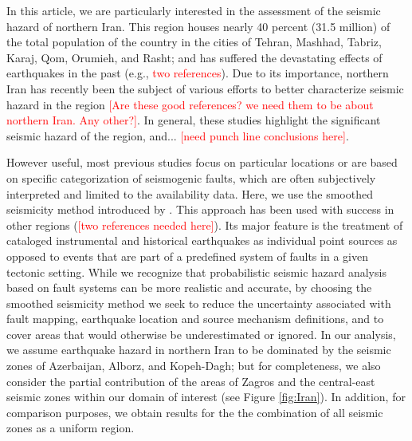 In this article, we are particularly interested in the assessment of the seismic hazard of northern Iran. This region houses nearly 40 percent (31.5 million) of the total population of the country in the cities of Tehran, Mashhad, Tabriz, Karaj, Qom, Orumieh, and Rasht; and has suffered the devastating effects of earthquakes in the past (e.g., \textcolor{red}{two references}). Due to its importance, northern Iran has recently been the subject of various efforts to better characterize seismic hazard in the region \citep[e.g.,][]{Ghodrati2011, Abdollahzadeh2014a, Boostan2015} \textcolor{red}{[Are these good references? we need them to be about northern Iran. Any other?]}. In general, these studies highlight the significant seismic hazard of the region, and... \textcolor{red}{[need punch line conclusions here]}. 

However useful, most previous studies focus on particular locations or are based on specific categorization of seismogenic faults, which are often subjectively interpreted and limited to the availability data. Here, we use the smoothed seismicity method introduced by \citet{Frankel1995}. This approach has been used with success in other regions (\textcolor{red}{[two references needed here]}). Its major feature is the treatment of cataloged instrumental and historical earthquakes as individual point sources as opposed to events that are part of a predefined system of faults in a given tectonic setting. While we recognize that probabilistic seismic hazard analysis based on fault systems can be more realistic and accurate, by choosing the smoothed seismicity method we seek to reduce the uncertainty associated with fault mapping, earthquake location and source mechanism definitions, and to cover areas that would otherwise be underestimated or ignored. In our analysis, we assume earthquake hazard in northern Iran to be dominated by the seismic zones of Azerbaijan, Alborz, and Kopeh-Dagh; but for completeness, we also consider the partial contribution of the areas of Zagros and the central-east seismic zones within our domain of interest (see Figure \ref{fig:Iran}). In addition, for comparison purposes, we obtain results for the the combination of all seismic zones as a uniform region.

